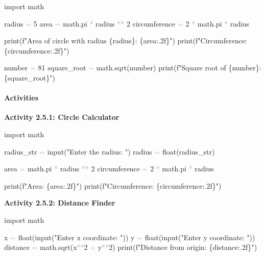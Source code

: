 \documentclass[
  justified,
  openright,
]{tufte-book}
\let\subsection\paragraph
\let\paragraph\paragraph
\newcommand{\StringTok}[1]{\textcolor{CodeString}{#1}}              %
\newcommand{\CodeNumTok}[1]{\textcolor{CodeNumber}{#1}}             %
\newcommand{\CodeAccentTok}[1]{\textcolor{CodeAccent}{#1}}          %
\newcommand{\OperatorTok}[1]{\textcolor{DarkGray}{#1}}              %
\newenvironment{Shaded}{%
  \begin{mdframed}[style=TufteCode]%
}{%
  \end{mdframed}%
}
\let\subsection\paragraph
\let\paragraph\paragraph
\begin{document}
\begin{Shaded}
\begin{Highlighting}[]
\CodeAccentTok{import} math
 
radius \OperatorTok{=} \CodeNumTok{5}
area \OperatorTok{=} math.pi \OperatorTok{*} radius \OperatorTok{**} \CodeNumTok{2}
circumference \OperatorTok{=} \CodeNumTok{2} \OperatorTok{*} math.pi \OperatorTok{*} radius
 
print(\StringTok{f"Area of circle with radius }\StringTok{\{}radius\StringTok{\}}\StringTok{: }\StringTok{\{}area\StringTok{:.2f\}}\StringTok{"})
print(\StringTok{f"Circumference: }\StringTok{\{}circumference\StringTok{:.2f\}}\StringTok{"})
 
number \OperatorTok{=} \CodeNumTok{81}
square\_root \OperatorTok{=} math.sqrt(number)
print(\StringTok{f"Square root of }\StringTok{\{}number\StringTok{\}}\StringTok{: }\StringTok{\{}square\_root\StringTok{\}}\StringTok{"})
\end{Highlighting}
\end{Shaded}

\subsection{Activities}\label{activities-6}

\textbf{Activity 2.5.1: Circle Calculator}

\begin{Shaded}
\begin{Highlighting}[]
\CodeAccentTok{import} math
 
radius\_str \OperatorTok{=} input(\StringTok{"Enter the radius: "})
radius \OperatorTok{=} float(radius\_str)
 
area \OperatorTok{=} math.pi \OperatorTok{*} radius \OperatorTok{**} \CodeNumTok{2}
circumference \OperatorTok{=} \CodeNumTok{2} \OperatorTok{*} math.pi \OperatorTok{*} radius
 
print(\StringTok{f"Area: }\StringTok{\{}area\StringTok{:.2f\}}\StringTok{"})
print(\StringTok{f"Circumference: }\StringTok{\{}circumference\StringTok{:.2f\}}\StringTok{"})
\end{Highlighting}
\end{Shaded}

\textbf{Activity 2.5.2: Distance Finder}

\begin{Shaded}
\begin{Highlighting}[]
\CodeAccentTok{import} math
 
x \OperatorTok{=} float(input(\StringTok{"Enter x coordinate: "}))
y \OperatorTok{=} float(input(\StringTok{"Enter y coordinate: "}))
distance \OperatorTok{=} math.sqrt(x\OperatorTok{**}\CodeNumTok{2} \OperatorTok{+} y\OperatorTok{**}\CodeNumTok{2})
print(\StringTok{f"Distance from origin: }\StringTok{\{}distance\StringTok{:.2f\}}\StringTok{"})
\end{Highlighting}
\end{Shaded}
\end{document}
